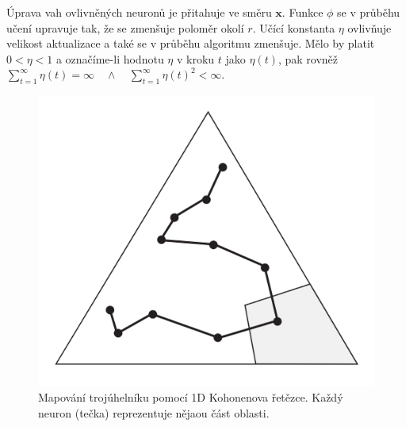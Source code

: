 \documentclass[11pt]{report} %
\renewcommand{\vec}[1]{\mathbf{#1}}
\numberwithin{equation}{section}
\begin{document}
Úprava vah ovlivněných neuronů je přitahuje ve směru $\vec{x}$. Funkce $\phi$ se v průběhu učení upravuje tak, že se zmenšuje poloměr okolí $r$. Učící konstanta $\eta$ ovlivňuje velikost aktualizace a také se v průběhu algoritmu zmenšuje. Mělo by platit $0 < \eta < 1$ a označíme-li hodnotu $\eta$ v kroku $t$ jako $\eta(t)$, pak rovněž $\sum_{t=1}^{\infty}\eta(t) = \infty \quad \wedge \quad \sum_{t=1}^{\infty}\eta(t)^2 < \infty$.

\begin{figure}[h]
	\centering
	\includegraphics[scale=0.7]{img/kohonen_triangle.png}
	\caption{Mapování trojúhelníku pomocí 1D Kohonenova řetězce. Každý neuron (tečka) reprezentuje nějaou část oblasti.}
\end{figure}
\end{document}
